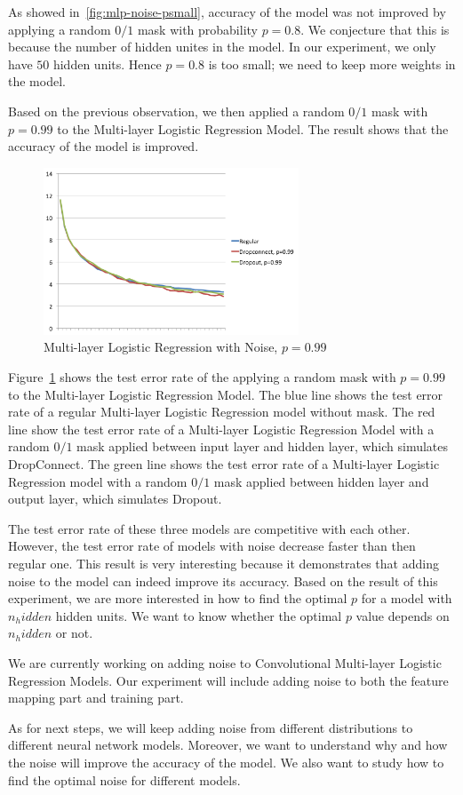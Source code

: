 As showed in~\ref{fig:mlp-noise-psmall}, accuracy of the model was not
improved by applying a random $0/1$ mask with probability $p=0.8$.
We conjecture that this is because the number of hidden unites in the
model. In our experiment, we only have $50$ hidden units. Hence $p=0.8$ is
too small; we need to keep more weights in the model.

Based on the previous observation, we then applied a random $0/1$ mask
with $p=0.99$ to the Multi-layer Logistic Regression Model. The result
shows that the accuracy of the model is improved.

\begin{figure}[h]
\centering
\includegraphics[width=215pt]{figs/mlp_pbig.png}
\caption{Multi-layer Logistic Regression with Noise, $p=0.99$}
\label{fig:mlp-noise-pbig}
\end{figure}

Figure~\ref{fig:mlp-noise-pbig} shows the test error rate of the
applying a random mask with $p=0.99$ to the Multi-layer Logistic
Regression Model.
The blue line shows the test error rate of a regular Multi-layer Logistic
Regression model without mask.
The red line show the test error rate of a Multi-layer Logistic Regression
Model with a random $0/1$ mask applied between input layer and hidden
layer, which simulates DropConnect.
The green line shows the test error rate of a Multi-layer Logistic
Regression model with a random $0/1$ mask applied between hidden layer and
output layer, which simulates Dropout.

The test error rate of these three models are competitive with each other.
However, the test error rate of models with noise decrease faster than
then regular one. This result is very interesting because it demonstrates
that adding noise to the model can indeed improve its accuracy.
Based on the result of this experiment, we are more interested in how to
find the optimal $p$ for a model with $n_hidden$ hidden units. We want to
know whether the optimal $p$ value depends on $n_hidden$ or not.

We are currently working on adding noise to Convolutional Multi-layer
Logistic Regression Models. Our experiment will include adding noise to
both the feature mapping part and training part.

As for next steps, we will keep adding noise from different
distributions to different neural network models.
Moreover, we want to understand why and how the noise will improve the
accuracy of the model. We also want to study how to find the optimal
noise for different models.


